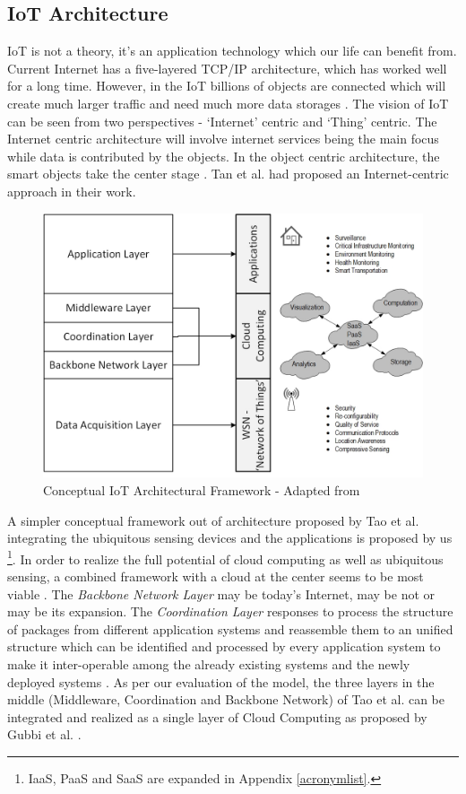 \subsection{IoT Architecture}
\acs{IoT} is not a theory, it's an application technology which our life can benefit from. Current Internet has a five-layered \acs{TCP}/\acs{IP} architecture, which has worked well for a long time. However, in the \acs{IoT} billions of objects are connected which will create much larger traffic and need much more data storages \cite{IOTFUTURE}. The vision of \acs{IoT} can be seen from two perspectives - ‘Internet’ centric and ‘Thing’ centric. The Internet centric architecture will involve internet services being the main focus while data is contributed by the objects. In the object centric architecture, the smart objects take the center stage \cite{IOTGUBBI}. Tan et al. \cite{IOTFUTURE} had proposed an Internet-centric approach in their work.
\begin{figure}[h!]
	\includegraphics[scale=0.5]{./gfx/iotarch}
	\centering
	\caption{Conceptual \acs{IoT} Architectural Framework - Adapted from \cite{IOTFUTURE,IOTGUBBI}}
	\label{fig:2.8}
\end{figure}

A simpler conceptual framework out of architecture proposed by Tao et al. \cite{IOTFUTURE} integrating the ubiquitous sensing devices and the applications is proposed by us  \footnote{\acs{IaaS}, \acs{PaaS} and \acs{SaaS} are expanded in Appendix \ref{acronymlist}.}. In order to realize the full potential of cloud computing as well as ubiquitous sensing, a combined framework with a cloud at the center seems to be most viable \cite{IOTGUBBI}. The \textit{Backbone Network Layer} may be today's Internet, may be not or may be its expansion. The \textit{Coordination Layer} responses to process the structure of packages from different application systems and reassemble them to an unified structure which can be identified and processed by every application system to make it inter-operable among the already existing systems and the newly deployed systems \cite{IOTFUTURE}. As per our evaluation of the model, the three layers in the middle (Middleware, Coordination and Backbone Network) of Tao et al. \cite{IOTFUTURE} can be integrated and realized as a single layer of Cloud Computing as proposed by Gubbi et al. \cite{IOTGUBBI}.

